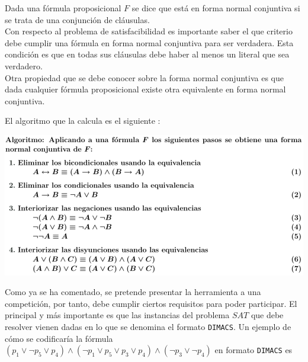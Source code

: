  Dada una fórmula proposicional $F$ se dice que está en forma normal conjuntiva si se trata de una conjunción de cláusulas. \\

Con respecto al problema de satisfacibilidad es importante saber el que criterio debe cumplir una fórmula en forma normal conjuntiva para ser verdadera. Esta condición es que en todas sus cláusulas debe haber al menos un literal que sea verdadero.\\

Otra propiedad que se debe conocer sobre la forma normal conjuntiva es que dada cualquier fórmula proposicional existe otra equivalente en forma normal conjuntiva. 

\newpage

El algoritmo que la calcula es el siguiente \cite{apuntes} :

\begin{center}
\includegraphics[scale=0.45]{imagenes/algfnc}
\end{center}

Como ya se ha comentado, se pretende presentar la herramienta a una competición, por tanto, debe cumplir ciertos requisitos para poder participar. El principal y más importante es que las instancias del problema $SAT$ que debe resolver vienen dadas en lo que se denomina el formato \texttt{DIMACS}. Un ejemplo de cómo se codificaría la fórmula $(p_1 \vee \neg p_5 \vee p_4)\wedge(\neg p_1 \vee p_5 \vee p_3 \vee p_4) \wedge (\neg p_3 \vee \neg p_4)$ en formato \texttt{DIMACS} es

